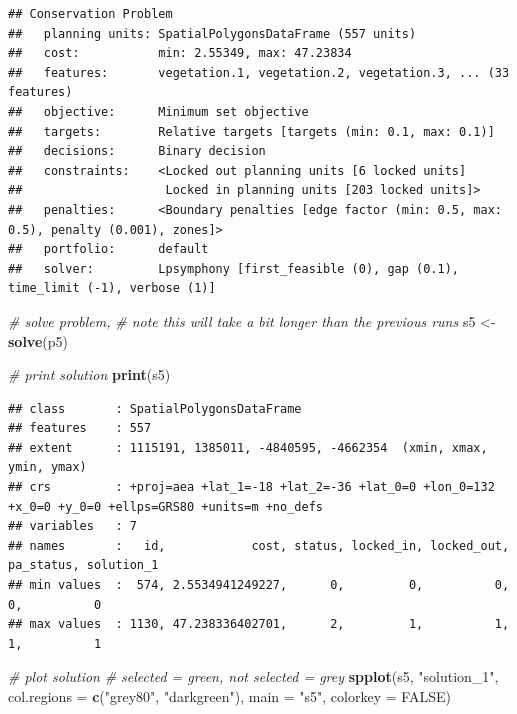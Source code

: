 \documentclass[12pt,]{book}
\newenvironment{Shaded}{\begin{snugshade}}{\end{snugshade}}
\newcommand{\KeywordTok}[1]{\textcolor[rgb]{0.13,0.29,0.53}{\textbf{#1}}}
\newcommand{\DataTypeTok}[1]{\textcolor[rgb]{0.13,0.29,0.53}{#1}}
\newcommand{\StringTok}[1]{\textcolor[rgb]{0.31,0.60,0.02}{#1}}
\newcommand{\CommentTok}[1]{\textcolor[rgb]{0.56,0.35,0.01}{\textit{#1}}}
\newcommand{\OtherTok}[1]{\textcolor[rgb]{0.56,0.35,0.01}{#1}}
\newcommand{\NormalTok}[1]{#1}
\begin{document}
\begin{verbatim}
## Conservation Problem
##   planning units: SpatialPolygonsDataFrame (557 units)
##   cost:           min: 2.55349, max: 47.23834
##   features:       vegetation.1, vegetation.2, vegetation.3, ... (33 features)
##   objective:      Minimum set objective 
##   targets:        Relative targets [targets (min: 0.1, max: 0.1)]
##   decisions:      Binary decision 
##   constraints:    <Locked out planning units [6 locked units]
##                    Locked in planning units [203 locked units]>
##   penalties:      <Boundary penalties [edge factor (min: 0.5, max: 0.5), penalty (0.001), zones]>
##   portfolio:      default
##   solver:         Lpsymphony [first_feasible (0), gap (0.1), time_limit (-1), verbose (1)]
\end{verbatim}

\begin{Shaded}
\begin{Highlighting}[]
\CommentTok{# solve problem,}
\CommentTok{# note this will take a bit longer than the previous runs}
\NormalTok{s5 <-}\StringTok{ }\KeywordTok{solve}\NormalTok{(p5)}

\CommentTok{# print solution}
\KeywordTok{print}\NormalTok{(s5)}
\end{Highlighting}
\end{Shaded}

\begin{verbatim}
## class       : SpatialPolygonsDataFrame 
## features    : 557 
## extent      : 1115191, 1385011, -4840595, -4662354  (xmin, xmax, ymin, ymax)
## crs         : +proj=aea +lat_1=-18 +lat_2=-36 +lat_0=0 +lon_0=132 +x_0=0 +y_0=0 +ellps=GRS80 +units=m +no_defs 
## variables   : 7
## names       :   id,            cost, status, locked_in, locked_out, pa_status, solution_1 
## min values  :  574, 2.5534941249227,      0,         0,          0,         0,          0 
## max values  : 1130, 47.238336402701,      2,         1,          1,         1,          1
\end{verbatim}

\begin{Shaded}
\begin{Highlighting}[]
\CommentTok{# plot solution}
\CommentTok{# selected = green, not selected = grey}
\KeywordTok{spplot}\NormalTok{(s5, }\StringTok{"solution_1"}\NormalTok{, }\DataTypeTok{col.regions =} \KeywordTok{c}\NormalTok{(}\StringTok{"grey80"}\NormalTok{, }\StringTok{"darkgreen"}\NormalTok{), }\DataTypeTok{main =} \StringTok{"s5"}\NormalTok{,}
       \DataTypeTok{colorkey =} \OtherTok{FALSE}\NormalTok{)}
\end{Highlighting}
\end{Shaded}
\end{document}
